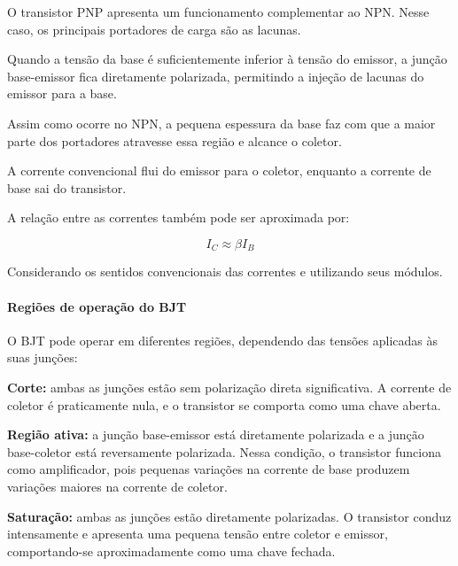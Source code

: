 O transistor PNP apresenta um funcionamento complementar ao NPN. Nesse caso, os principais portadores de carga são as lacunas.

Quando a tensão da base é suficientemente inferior à tensão do emissor, a junção base-emissor fica diretamente polarizada, permitindo a injeção de lacunas do emissor para a base.

Assim como ocorre no NPN, a pequena espessura da base faz com que a maior parte dos portadores atravesse essa região e alcance o coletor.

A corrente convencional flui do emissor para o coletor, enquanto a corrente de base sai do transistor.

A relação entre as correntes também pode ser aproximada por:

\[
I_C \approx \beta I_B
\]

Considerando os sentidos convencionais das correntes e utilizando seus módulos.

\paragraph{Regiões de operação do BJT}

O BJT pode operar em diferentes regiões, dependendo das tensões aplicadas às suas junções:


\textbf{Corte:} ambas as junções estão sem polarização direta significativa. A corrente de coletor é praticamente nula, e o transistor se comporta como uma chave aberta.
    
\textbf{Região ativa:} a junção base-emissor está diretamente polarizada e a junção base-coletor está reversamente polarizada. Nessa condição, o transistor funciona como amplificador, pois pequenas variações na corrente de base produzem variações maiores na corrente de coletor.
    
\textbf{Saturação:} ambas as junções estão diretamente polarizadas. O transistor conduz intensamente e apresenta uma pequena tensão entre coletor e emissor, comportando-se aproximadamente como uma chave fechada.
